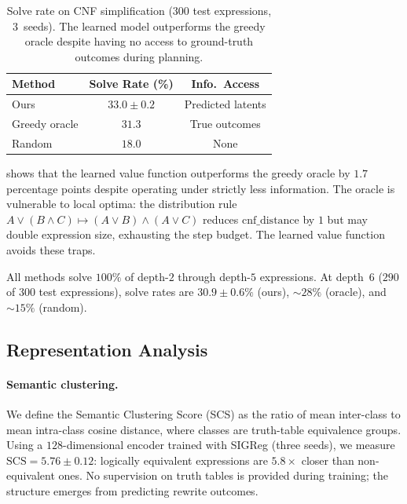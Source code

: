 \documentclass{article}
\begin{document}
\begin{table}[t]
  \caption{Solve rate on CNF simplification ($300$ test expressions,
  $3$~seeds). The learned model outperforms the greedy oracle despite
  having no access to ground-truth outcomes during planning.}
  \label{tab:main}
  \vskip 0.1in
  \begin{center}
    \begin{small}
      \begin{sc}
        \begin{tabular}{lcc}
          \toprule
          Method & Solve Rate (\%) & Info.\ Access \\
          \midrule
          Ours & $\mathbf{33.0 \pm 0.2}$ & Predicted latents \\
          Greedy oracle & $31.3$ & True outcomes \\
          Random & $18.0$ & None \\
          \bottomrule
        \end{tabular}
      \end{sc}
    \end{small}
  \end{center}
  \vskip -0.1in
\end{table}

 shows that the learned value function outperforms the
greedy oracle by $1.7$ percentage points despite operating under strictly
less information. The oracle is vulnerable to local optima: the
distribution rule $A \vee (B \wedge C) \mapsto (A \vee B) \wedge (A \vee
C)$ reduces $\text{cnf\_distance}$ by $1$ but may double expression size,
exhausting the step budget. The learned value function avoids these traps.

All methods solve $100\%$ of depth-$2$ through depth-$5$ expressions. At
depth~$6$ ($290$ of $300$ test expressions), solve rates are $30.9 \pm
0.6\%$ (ours), ${\sim}28\%$ (oracle), and ${\sim}15\%$ (random).

\subsection{Representation Analysis}

\paragraph{Semantic clustering.}
We define the Semantic Clustering Score (SCS) as the ratio of mean
inter-class to mean intra-class cosine distance, where classes are
truth-table equivalence groups. Using a $128$-dimensional encoder trained
with SIGReg (three seeds), we measure $\text{SCS} = 5.76 \pm 0.12$:
logically equivalent expressions are $5.8\times$ closer than
non-equivalent ones. No supervision on truth tables is provided during
training; the structure emerges from predicting rewrite outcomes.
\end{document}
